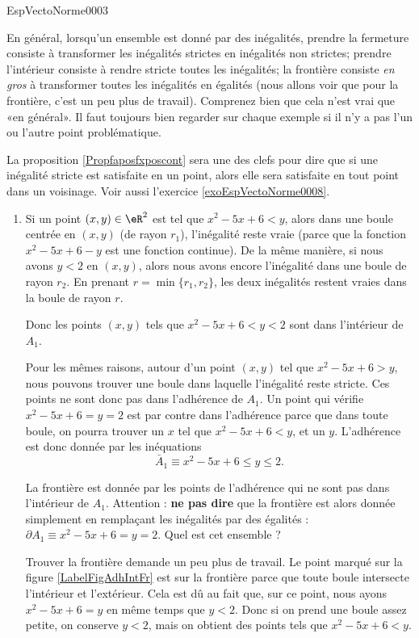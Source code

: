 \begin{corrige}{EspVectoNorme0003}

	En général, lorsqu'un ensemble est donné par des inégalités, prendre la fermeture consiste à transformer les inégalités strictes en inégalités non strictes; prendre l'intérieur consiste à rendre stricte toutes les inégalités; la frontière consiste \emph{en gros} à transformer toutes les inégalités en égalités (nous allons voir que pour la frontière, c'est un peu plus de travail). Comprenez bien que cela n'est vrai que «en général». Il faut toujours bien regarder sur chaque exemple si il n'y a pas l'un ou l'autre point problématique.

	La proposition \ref{Propfaposfxposcont} sera une des clefs pour dire que si une inégalité stricte est satisfaite en un point, alors elle sera satisfaite en tout point dans un voisinage. Voir aussi l'exercice \ref{exoEspVectoNorme0008}.
	\begin{enumerate}
		\item
			Si un point $(x,y)\in\eR^2$ est tel que $x^2-5x+6<y$, alors dans une boule centrée en $(x,y)$ (de rayon $r_1$), l'inégalité reste vraie (parce que la fonction $x^2-5x+6-y$ est une fonction continue). De la même manière, si nous avons $y<2$ en $(x,y)$, alors nous avons encore l'inégalité dans une boule de rayon $r_2$. En prenant $r=\min\{ r_1,r_2 \}$, les deux inégalités restent vraies dans la boule de rayon $r$.

			Donc les points $(x,y)$ tels que $x^2 - 5x + 6 < y < 2$ sont dans l'intérieur de $A_1$.
			
			Pour les mêmes raisons, autour d'un point $(x,y)$ tel que $x^2-5x+6>y$, nous pouvons trouver une boule dans laquelle l'inégalité reste stricte. Ces points ne sont donc pas dans l'adhérence de $A_1$. Un point qui vérifie $x^2-5x+6= y= 2$ est par contre dans l'adhérence parce que dans toute boule, on pourra trouver un $x$ tel que $x^2-5x+6<y$, et un $y$. L'adhérence est donc donnée par les inéquations
			\begin{equation}
				\bar A_1\equiv x^2-5x+6\leq y\leq 2.
			\end{equation}
			
			La frontière est donnée par les points de l'adhérence qui ne sont pas dans l'intérieur de $A_1$. Attention : {\bf ne pas dire} que la frontière est alors donnée simplement en remplaçant les inégalités par des égalités : $\partial A_1\equiv x^2-5x+6= y= 2$. Quel est cet ensemble ?

			Trouver la frontière demande un peu plus de travail. Le point marqué sur la figure \ref{LabelFigAdhIntFr} est sur la frontière parce que toute boule intersecte l'intérieur et l'extérieur. Cela est dû au fait que, sur ce point, nous ayons $x^2-5x+6=y$ en même temps que $y<2$. Donc si on prend une boule assez petite, on conserve $y<2$, mais on obtient des points tels que $x^2-5x+6<y$. 


\end{enumerate}
\end{corrige}
